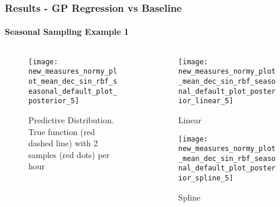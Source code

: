 \documentclass[
	8pt, %
]{beamer}
\begin{document}
\begin{frame}
	\frametitle{Results - GP Regression vs Baseline}
	\framesubtitle{Seasonal Sampling Example 1}

	\begin{columns}[c] %
		\begin{column}{0.5\textwidth} %
				\begin{figure}
					\texttt{[image: new\_measures\_normy\_plot\_mean\_dec\_sin\_rbf\_seasonal\_default\_plot\_posterior\_5]}
					\caption{Predictive Distribution. True function (red dashed line) with 2 samples (red dots) per hour}
				\end{figure}
		\end{column}
		\begin{column}{0.5\textwidth} %
				\begin{figure}
					\texttt{[image: new\_measures\_normy\_plot\_mean\_dec\_sin\_rbf\_seasonal\_default\_plot\_posterior\_linear\_5]}
					\caption{Linear}
				\end{figure}

				\begin{figure}
					\texttt{[image: new\_measures\_normy\_plot\_mean\_dec\_sin\_rbf\_seasonal\_default\_plot\_posterior\_spline\_5]}
					\caption{Spline}
				\end{figure}
		\end{column}
	\end{columns}

\end{frame}
\end{document}
